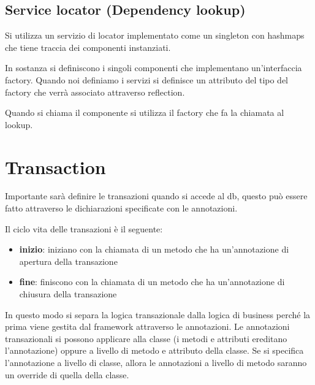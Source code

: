 \subsection{Service locator (Dependency lookup)}
Si utilizza un servizio di locator implementato come un singleton con hashmaps
che tiene traccia dei componenti instanziati. 

In sostanza si definiscono i singoli componenti che implementano un'interfaccia
factory. Quando noi definiamo i servizi si definisce un attributo del tipo del
factory che verrà associato attraverso reflection. 

Quando si chiama il componente si utilizza il factory che fa la chiamata al lookup.

\section{Transaction}
Importante sarà definire le transazioni quando si accede al db, questo può essere
fatto attraverso le dichiarazioni specificate con le annotazioni. 

Il ciclo vita delle transazioni è il seguente:
\begin{itemize}
      \item \textbf{inizio}: iniziano con la chiamata di un metodo che ha un'annotazione
      di apertura della transazione
      \item \textbf{fine}: finiscono con la chiamata di un metodo che ha un'annotazione
      di chiusura della transazione
\end{itemize}
In questo modo si separa la logica transazionale dalla logica di business perché
la prima viene gestita dal framework attraverso le annotazioni. Le annotazioni
transazionali si possono applicare alla classe (i metodi e attributi ereditano
l'annotazione) oppure a livello di metodo e attributo della classe. Se si specifica
l'annotazione a livello di classe, allora le annotazioni a livello di metodo saranno
un override di quella della classe.

